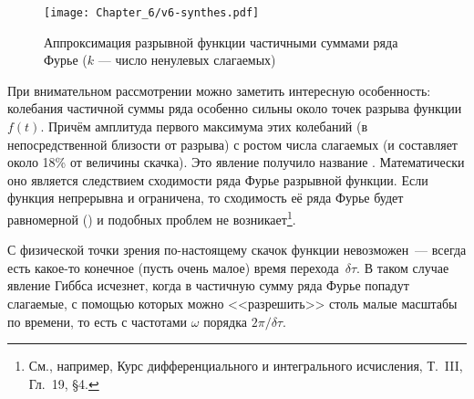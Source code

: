 \begin{figure}[h!]
    \hfill\texttt{[image: Chapter\_6/v6-synthes.pdf]}
    \caption{Аппроксимация разрывной функции частичными суммами ряда Фурье
        ($k$ --- число ненулевых слагаемых)}
\end{figure}

При внимательном рассмотрении можно заметить интересную особенность:
колебания частичной суммы ряда особенно сильны около точек разрыва
функции $f(t)$. Причём
амплитуда первого максимума этих колебаний (в непосредственной близости от
разрыва)  с ростом числа слагаемых (и составляет около 18\%
от величины скачка). Это явление получило название .
Математически оно является следствием  сходимости ряда
Фурье разрывной функции. Если функция непрерывна и ограничена, то сходимость
её ряда Фурье будет равномерной () и подобных проблем
не возникает\footnote{См., например,
 Курс дифференциального и интегрального исчисления,
Т.~III, Гл.~19, \S4.}.


С физической точки зрения по-настоящему  скачок функции
невозможен~--- всегда есть какое-то конечное (пусть очень малое) время
перехода~$\delta\tau$. В таком случае явление Гиббса исчезнет, когда в
частичную сумму ряда Фурье попадут слагаемые, с помощью которых можно
<<разрешить>> столь малые масштабы по времени, то есть с частотами
$\omega$ порядка $2\pi /\delta \tau$.

